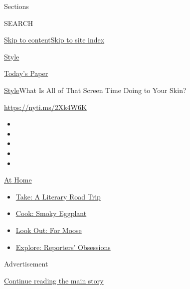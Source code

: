 Sections

SEARCH

\protect\hyperlink{site-content}{Skip to
content}\protect\hyperlink{site-index}{Skip to site index}

\href{https://www.nytimes.com/section/style}{Style}

\href{https://myaccount.nytimes.com/auth/login?response_type=cookie\&client_id=vi}{}

\href{https://www.nytimes.com/section/todayspaper}{Today's Paper}

\href{/section/style}{Style}\textbar{}What Is All of That Screen Time
Doing to Your Skin?

\url{https://nyti.ms/2Xk4W6K}

\begin{itemize}
\item
\item
\item
\item
\item
\end{itemize}

\href{https://www.nytimes.com/spotlight/at-home?action=click\&pgtype=Article\&state=default\&region=TOP_BANNER\&context=at_home_menu}{At
Home}

\begin{itemize}
\tightlist
\item
  \href{https://www.nytimes.com/2020/07/28/books/time-for-a-literary-road-trip.html?action=click\&pgtype=Article\&state=default\&region=TOP_BANNER\&context=at_home_menu}{Take:
  A Literary Road Trip}
\item
  \href{https://www.nytimes.com/2020/07/29/magazine/bored-with-your-home-cooking-some-smoky-eggplant-will-fix-that.html?action=click\&pgtype=Article\&state=default\&region=TOP_BANNER\&context=at_home_menu}{Cook:
  Smoky Eggplant}
\item
  \href{https://www.nytimes.com/2020/07/27/travel/moose-michigan-isle-royale.html?action=click\&pgtype=Article\&state=default\&region=TOP_BANNER\&context=at_home_menu}{Look
  Out: For Moose}
\item
  \href{https://www.nytimes.com/interactive/2020/at-home/even-more-reporters-editors-diaries-lists-recommendations.html?action=click\&pgtype=Article\&state=default\&region=TOP_BANNER\&context=at_home_menu}{Explore:
  Reporters' Obsessions}
\end{itemize}

Advertisement

\protect\hyperlink{after-top}{Continue reading the main story}

